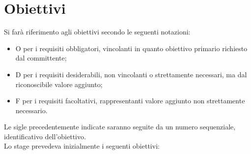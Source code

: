 \section{Obiettivi}
Si farà riferimento agli obiettivi secondo le seguenti notazioni:
\begin{itemize}
	\item O per i requisiti obbligatori, vincolanti in quanto obiettivo primario richiesto dal committente;
	\item D per i requisiti desiderabili, non vincolanti o strettamente necessari,
		  ma dal riconoscibile valore aggiunto;
	\item F per i requisiti facoltativi, rappresentanti valore aggiunto non strettamente 
		  necessario.
\end{itemize}
Le sigle precedentemente indicate saranno seguite da un numero sequenziale, identificativo dell'obiettivo.
\\
Lo stage prevedeva inizialmente i seguenti obiettivi:
